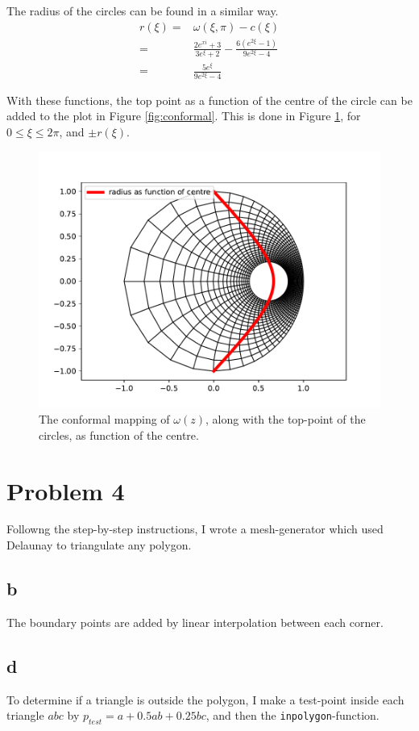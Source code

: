 \documentclass[aps, 12pt]{revtex4}
\begin{document}
The radius of the circles can be found in a similar way.
\begin{align*}
    r(\xi) = & \omega(\xi, \pi) - c(\xi)
    \\
    =        & \frac{2e^{xi}+3}{3e^{\xi}+2} - \frac{6(e^{2\xi}-1)}{9e^{2\xi}-4}
    \\
    =        & \frac{5e^{\xi}}{9e^{2\xi}-4}
\end{align*}

With these functions, the top point as a function of the centre of the circle can be added to the plot in Figure \ref{fig:conformal}. This is done in Figure \ref{fig:cr}, for $0\leq \xi \leq 2\pi$, and $\pm r(\xi)$.

\begin{figure}
    \includegraphics[width=0.8\linewidth]{conformal_cr.pdf}
    \caption{The conformal mapping of $\omega(z)$, along with the top-point of the circles, as function of the centre.}
    \label{fig:cr}
\end{figure}


\section*{Problem 4}
Followng the step-by-step instructions, I wrote a mesh-generator which used Delaunay to triangulate any polygon.

\subsection*{b}
The boundary points are added by linear interpolation between each corner.

\subsection*{d}
To determine if a triangle is outside the polygon, I make a test-point inside each triangle $abc$ by $p_{test} = a + 0.5ab + 0.25 bc$, and then the \texttt{inpolygon}-function.
\end{document}
